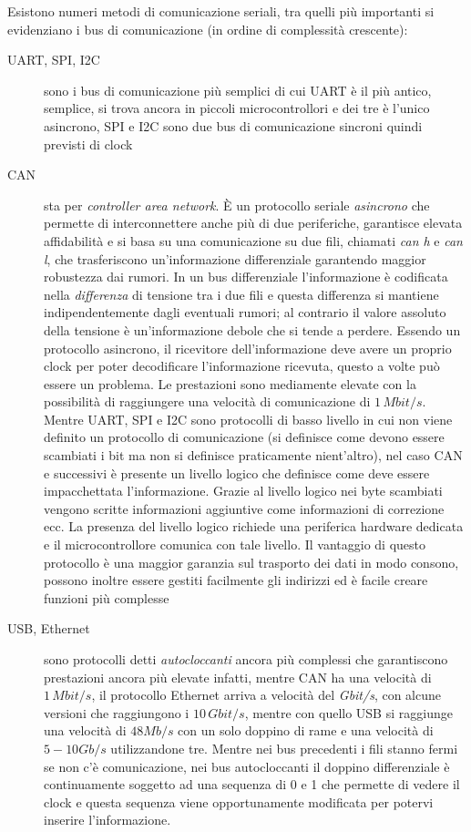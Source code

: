 \documentclass[12pt, a4paper]{report}
\begin{document}
Esistono numeri metodi di comunicazione seriali, tra quelli più importanti si evidenziano i bus di comunicazione (in ordine di complessità crescente):
\begin{description}
    \item[UART, SPI, I2C] sono i bus di comunicazione più semplici di cui UART è il più antico, semplice, si trova ancora in piccoli microcontrollori e dei tre è l'unico asincrono, SPI e I2C sono due bus di comunicazione sincroni quindi previsti di clock
    \item[CAN] sta per \textit{controller area network}. È un protocollo seriale \textit{asincrono} che permette di interconnettere anche più di due periferiche, garantisce elevata affidabilità e si basa su una comunicazione su due fili, chiamati \textit{can h} e \textit{can l}, che trasferiscono un'informazione differenziale garantendo maggior robustezza dai rumori. In un bus differenziale l'informazione è codificata nella \textit{differenza} di tensione tra i due fili e questa differenza si mantiene indipendentemente dagli eventuali rumori; al contrario il valore assoluto della tensione è un'informazione debole che si tende a perdere. Essendo un protocollo asincrono, il ricevitore dell'informazione deve avere un proprio clock per poter decodificare l'informazione ricevuta, questo a volte può essere un problema. Le prestazioni sono mediamente elevate con la possibilità di raggiungere una velocità di comunicazione di $1\,\textit{Mbit/s}$. Mentre UART, SPI e I2C sono protocolli di basso livello in cui non viene definito un protocollo di comunicazione (si definisce come devono essere scambiati i bit ma non si definisce praticamente nient'altro), nel caso CAN e successivi è presente un livello logico che definisce come deve essere impacchettata l'informazione. Grazie al livello logico nei byte scambiati vengono scritte informazioni aggiuntive come informazioni di correzione ecc. La presenza del livello logico richiede  una periferica hardware dedicata e il microcontrollore comunica con tale livello. Il vantaggio di questo protocollo è una maggior garanzia sul trasporto dei dati in modo consono, possono inoltre essere gestiti facilmente gli indirizzi ed è facile creare funzioni più complesse
    \item[USB, Ethernet] sono protocolli detti \textit{autocloccanti} ancora più complessi che garantiscono prestazioni ancora più elevate infatti, mentre CAN ha una velocità di $1\,\textit{Mbit/s}$, il protocollo Ethernet arriva a velocità del \textit{Gbit/s}, con alcune versioni che raggiungono i $10\,\textit{Gbit/s}$, mentre con quello USB si raggiunge una velocità di $48 \textit{Mb/s}$ con un solo doppino di rame e una velocità di $5 - 10 \textit{Gb/s}$ utilizzandone tre. Mentre nei bus precedenti i fili stanno fermi se non c'è comunicazione, nei bus autocloccanti il doppino differenziale è continuamente soggetto ad una sequenza di 0 e 1 che permette di vedere il clock e questa sequenza viene opportunamente modificata per potervi inserire l'informazione.

\end{description}
\end{document}
